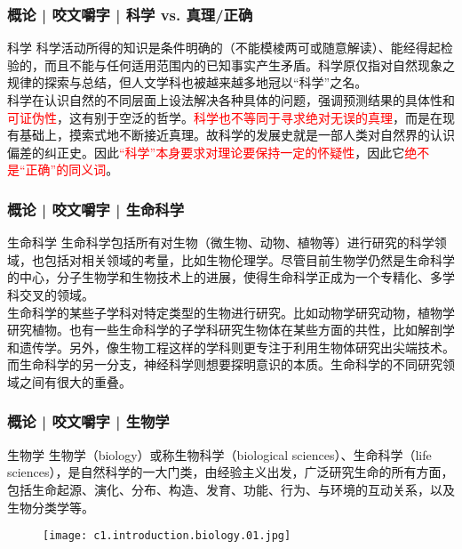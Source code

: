 \begin{frame}
  \frametitle{概论 | 咬文嚼字 | 科学 vs. 真理/正确}
  \begin{block}{科学}
科学活动所得的知识是条件明确的（不能模棱两可或随意解读）、能经得起检验的，而且不能与任何适用范围内的已知事实产生矛盾。科学原仅指对自然现象之规律的探索与总结，但人文学科也被越来越多地冠以“科学”之名。\\
    \vspace{1em}
科学在认识自然的不同层面上设法解决各种具体的问题，强调预测结果的具体性和\textcolor{red}{可证伪性}，这有别于空泛的哲学。\textcolor{red}{科学也不等同于寻求绝对无误的真理}，而是在现有基础上，摸索式地不断接近真理。故科学的发展史就是一部人类对自然界的认识偏差的纠正史。因此\textcolor{red}{“科学”本身要求对理论要保持一定的怀疑性}，因此它\textcolor{red}{绝不是“正确”的同义词}。
  \end{block}
\end{frame}

\begin{frame}
  \frametitle{概论 | 咬文嚼字 | 生命科学}
  \begin{block}{生命科学}
生命科学包括所有对生物（微生物、动物、植物等）进行研究的科学领域，也包括对相关领域的考量，比如生物伦理学。尽管目前生物学仍然是生命科学的中心，分子生物学和生物技术上的进展，使得生命科学正成为一个专精化、多学科交叉的领域。\\
    \vspace{1em}
生命科学的某些子学科对特定类型的生物进行研究。比如动物学研究动物，植物学研究植物。也有一些生命科学的子学科研究生物体在某些方面的共性，比如解剖学和遗传学。另外，像生物工程这样的学科则更专注于利用生物体研究出尖端技术。而生命科学的另一分支，神经科学则想要探明意识的本质。生命科学的不同研究领域之间有很大的重叠。\\
  \end{block}
\end{frame}

\begin{frame}
  \frametitle{概论 | 咬文嚼字 | 生物学}
  \begin{block}{生物学}
   生物学（biology）或称生物科学（biological sciences）、生命科学（life sciences），是自然科学的一大门类，由经验主义出发，广泛研究生命的所有方面，包括生命起源、演化、分布、构造、发育、功能、行为、与环境的互动关系，以及生物分类学等。\\
  \end{block}
  \begin{figure}
    \centering
    \texttt{[image: c1.introduction.biology.01.jpg]}
  \end{figure}
\end{frame}

